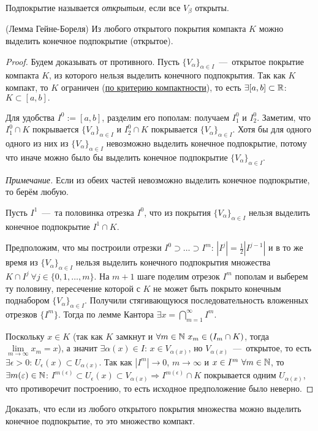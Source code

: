 \begin{definition}
    Подпокрытие называется \textit{открытым}, если все $V_{\beta}$ открыты.
\end{definition}
\newpage
\begin{lemma}
    (Лемма Гейне-Бореля) Из любого открытого покрытия компакта $K$ можно выделить конечное подпокрытие (открытое).
\end{lemma}
\begin{proof}
    Будем доказывать от противного. Пусть $\{ V_{\alpha}\}_{\alpha \in I}$~---~открытое покрытие компакта $K$, из которого нельзя выделить конечного подпокрытия. Так как $K$ компакт, то $K$ ограничен (\hyperlink{thm3.2}{по критерию компактности}), то есть $\exists [a, b] \subset \mathbb{R}$: $K \subset [a, b].$ 
    
    Для удобства $I^{0} := [a, b]$, разделим его пополам: получаем $I^{0}_{1}$ и $I^{0}_{2}$. Заметим, что $I^{0}_{1} \cap K$ покрывается $\{ V_{\alpha}\}_{\alpha \in I}$ и $I^{0}_{2} \cap K$ покрывается $\{ V_{\alpha}\}_{\alpha \in I}$. Хотя бы для одного одного из них из $\{ V_{\alpha}\}_{\alpha \in I}$ невозможно выделить конечное подпокрытие, потому что иначе можно было бы выделить конечное подпокрытие $\{ V_{\alpha} \}_{\alpha \in I}$.

    \textit{Примечание.} Если из обеих частей невозможно выделить конечное подпокрытие, то берём любую.

    Пусть $I^{1}$~---~та половинка отрезка $I^{0}$, что из покрытия $\{ V_{\alpha}\}_{\alpha \in I}$ нельзя выделить конечное подпокрытие $I^{1} \cap K.$

    Предположим, что мы построили отрезки $I^{0} \supset \ldots \supset I^{m}$: $|I^{j}| = \frac{1}{2}|I^{j - 1}|$ и в то же время из $\{ V_{\alpha}\}_{\alpha \in I}$ нельзя выделить конечного подпокрытия множества $K \cap I^{j} \ \forall j \in \{ 0, 1, \ldots, m\}.$ На $m + 1$ шаге поделим отрезок $I^{m}$ пополам и выберем ту половину, пересечение которой с $K$ не может быть покрыто конечным поднабором $\{ V_{\alpha}\}_{\alpha \in I}.$ Получили стягивающуюся последовательность вложенных отрезков $\{ I^{m} \}$. Тогда по лемме Кантора $\displaystyle \exists x = \bigcap_{m = 1}^{\infty} I^{m}.$ 
    
    Поскольку $\displaystyle x \in K$ (так как $K$ замкнут и $\forall m \in \mathbb{N} \ x_{m} \in (I_{m} \cap K)$, тогда $\lim\limits_{m \to \infty} x_{m} = x$), а значит $\exists \alpha (x) \in I$: $x \in V_{\alpha (x)}$, но $V_{\alpha (x)}$~---~открытое, то есть $\exists \epsilon > 0$: $U_{\epsilon} (x) \subset U_{\alpha (x)}$. Так как $|I^{m}| \to 0$, $m \to \infty$ и $x \in I^{m} \ \forall m \in \mathbb{N}$, то $\exists m (\varepsilon) \in \mathbb{N}$: $I^{m (\epsilon)} \subset U_{\epsilon} (x) \subset V_{\alpha (x)} \Rightarrow I^{m (\epsilon)} \cap K$ покрывается одним $U_{\alpha (x)}$, что противоречит построению, то есть исходное предположение было неверно.

\end{proof}
\begin{problem}
    Доказать, что если из любого открытого покрытия множества можно выделить конечное подпокрытие, то это множество компакт.
\end{problem}